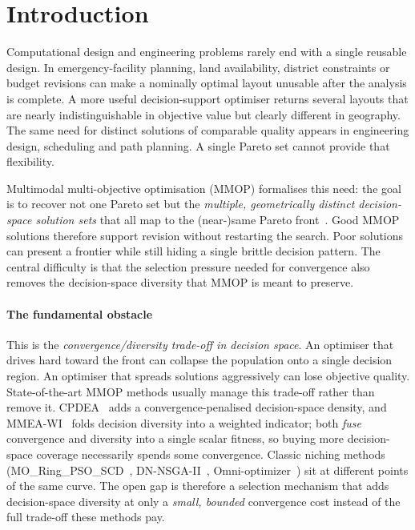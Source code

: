 \section{Introduction}
\label{sec:intro}

Computational design and engineering problems rarely end with a single reusable design. In
emergency-facility planning, land availability, district constraints or budget revisions can make
a nominally optimal layout unusable after the analysis is complete. A more useful decision-support
optimiser returns several layouts that are nearly indistinguishable in objective value but clearly
different in geography. The same need for distinct solutions of comparable quality appears in
engineering design, scheduling and path planning. A single Pareto set cannot provide that
flexibility.

Multimodal multi-objective optimisation (MMOP) formalises this need: the goal is to recover
not one Pareto set but the \emph{multiple, geometrically distinct decision-space solution
sets} that all map to the (near-)same Pareto front~\parencite{yue2018moring,yue2019mmf}. Good MMOP
solutions therefore support revision without restarting the search. Poor solutions can present a
frontier while still hiding a single brittle decision pattern. The central difficulty is that the
selection pressure needed for convergence also removes the decision-space diversity that MMOP is
meant to preserve.

\paragraph{The fundamental obstacle} This is the \emph{convergence/diversity trade-off in
decision space}. An optimiser that drives hard toward the front can collapse the population onto a
single decision region. An optimiser that spreads solutions aggressively can lose objective
quality. State-of-the-art MMOP methods usually manage this trade-off rather than remove it.
CPDEA~\parencite{liu2020cpdea} adds a convergence-penalised decision-space density, and
MMEA-WI~\parencite{li2021mmeawi} folds decision diversity into a weighted indicator; both
\emph{fuse} convergence and diversity into a single scalar fitness, so buying more
decision-space coverage necessarily spends some convergence. Classic niching methods
(MO\_Ring\_PSO\_SCD~\parencite{yue2018moring}, DN-NSGA-II~\parencite{liang2016dnnsga2},
Omni-optimizer~\parencite{deb2008omni}) sit at different points of the same curve. The open
gap is therefore a selection mechanism that adds decision-space diversity at only a
\emph{small, bounded} convergence cost instead of the full trade-off these methods pay.

